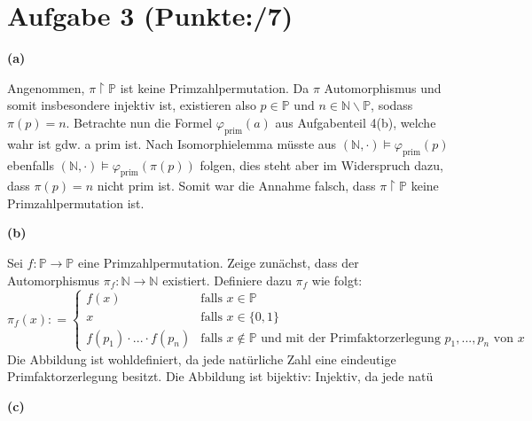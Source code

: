 \documentclass[11pt, a4paper]{article}
\newcommand{\pp}{7}
\newcommand{\defgr}{\mathrel{\mathop:\!\!=}}
\begin{document}
\section*{Aufgabe 3 (Punkte:\qquad/\pp)}
\textbf{(a)}
\begin{adjustwidth}{20pt}{20pt}
	Angenommen, $\pi\upharpoonright\mathbb{P}$ ist keine Primzahlpermutation. Da $\pi$ Automorphismus und somit insbesondere injektiv ist, existieren also
	$p \in \mathbb{P}$ und $n \in \mathbb{N}\backslash \mathbb{P}$, sodass $\pi(p)=n$. Betrachte nun die Formel $\varphi_{\text{prim}}(a)$ aus Aufgabenteil 4(b), welche
	wahr ist gdw. a prim ist. Nach Isomorphielemma müsste aus $(\mathbb{N},\cdot) \models \varphi_{\text{prim}}(p)$ ebenfalls
	$(\mathbb{N},\cdot) \models \varphi_{\text{prim}}(\pi(p))$ folgen, dies steht aber im Widerspruch dazu, dass $\pi(p)=n$ nicht prim ist. Somit war die Annahme falsch, dass
	$\pi\upharpoonright\mathbb{P}$ keine Primzahlpermutation ist.
\end{adjustwidth}
\textbf{(b)}
\begin{adjustwidth}{20pt}{20pt}
	Sei $f:\mathbb{P}\to \mathbb{P}$ eine Primzahlpermutation. Zeige zunächst, dass der Automorphismus $\pi_f:\mathbb{N} \to \mathbb{N}$ existiert. Definiere dazu $\pi_f$ wie
	folgt:
	\[
	\pi_f(x) \defgr 
	\begin{cases}
	f(x) & \text{falls $x\in \mathbb{P}$}\\
	x & \text{falls $x \in \{0,1\}$}\\
	f(p_1)\cdot...\cdot f(p_n) & \text{falls $x\notin \mathbb{P}$ und mit der Primfaktorzerlegung $p_1,...,p_n$ von $x$}
	\end{cases}
	\]
	Die Abbildung ist wohldefiniert, da jede natürliche Zahl eine eindeutige Primfaktorzerlegung besitzt. Die Abbildung ist bijektiv: Injektiv, da jede natü
\end{adjustwidth}
\textbf{(c)}
\begin{adjustwidth}{20pt}{20pt}

\end{adjustwidth}
\end{document}
